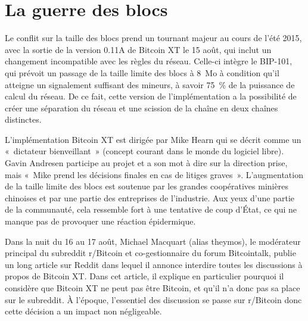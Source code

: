\section{La guerre des blocs} %

Le conflit sur la taille des blocs prend un tournant majeur au cours de l'été 2015, avec la sortie de la version 0.11A de Bitcoin XT le 15 août, qui inclut un changement incompatible avec les règles du réseau. Celle-ci intègre le BIP-101, qui prévoit un passage de la taille limite des blocs à 8~Mo à condition qu'il atteigne un signalement suffisant des mineurs, à savoir 75~\% de la puissance de calcul du réseau. De ce fait, cette version de l'implémentation a la possibilité de créer une séparation du réseau et une scission de la chaîne en deux chaînes distinctes. 

L'implémentation Bitcoin XT est dirigée par Mike Hearn qui se décrit comme un «~dictateur bienveillant~» (concept courant dans le monde du logiciel libre). Gavin Andresen participe au projet et a son mot à dire sur la direction prise, mais «~Mike prend les décisions finales en cas de litiges graves~». L'augmentation de la taille limite des blocs est soutenue par les grandes coopératives minières chinoises et par une partie des entreprises de l'industrie. Aux yeux d'une partie de la communauté, cela ressemble fort à une tentative de coup d'État, ce qui ne manque pas de provoquer une réaction épidermique.  

Dans la nuit du 16 au 17 août, Michael Macquart (alias theymos), le modérateur principal du subreddit r/Bitcoin et co-gestionnaire du forum Bitcointalk, publie un long article sur Reddit dans lequel il annonce interdire toutes les discussions à propos de Bitcoin XT. Dans cet article, il explique en particulier pourquoi il considère que Bitcoin XT ne peut pas être Bitcoin, et qu'il n'a donc pas sa place sur le subreddit. À l'époque, l'essentiel des discussion se passe sur r/Bitcoin donc cette décision a un impact non négligeable.

